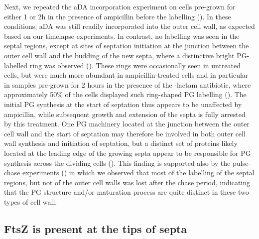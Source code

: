 Next, we repeated the aDA incorporation experiment on cells pre-grown for either 1 or 2h in the presence of ampicillin before the labelling ().
In these conditions, aDA was still readily incorporated into the outer cell wall, as expected based on our timelapse experiments.
In contrast, no labelling was seen in the septal regions, except at sites of septation initiation at the junction between the outer cell wall and the budding of the new septa, where a distinctive bright PG-labelled ring was observed ().
These rings were occasionally seen in untreated cells, but were much more abundant in ampicillin-treated cells and in particular in samples pre-grown for 2 hours in the presence of the \beta-lactam antibiotic, where approximately 50\% of the cells displayed such ring-shaped PG labelling ().
The initial PG synthesis at the start of septation thus appears to be unaffected by ampicillin, while subsequent growth and extension of the septa is fully arrested by this treatment.
One PG machinery located at the junction between the outer cell wall and the start of septation may therefore be involved in both outer cell wall synthesis and initiation of septation, but a distinct set of proteins likely located at the leading edge of the growing septa appear to be responsible for PG synthesis across the dividing cells ().
This finding is supported also by the pulse-chase experiments () in which we observed that most of the labelling of the septal regions, but not of the outer cell walls was lost after the chase period, indicating that the PG structure and/or maturation process are quite distinct in these two types of cell wall.

\FloatBarrier

\subsection{FtsZ is present at the tips of septa}\label{drad_ftsz}

